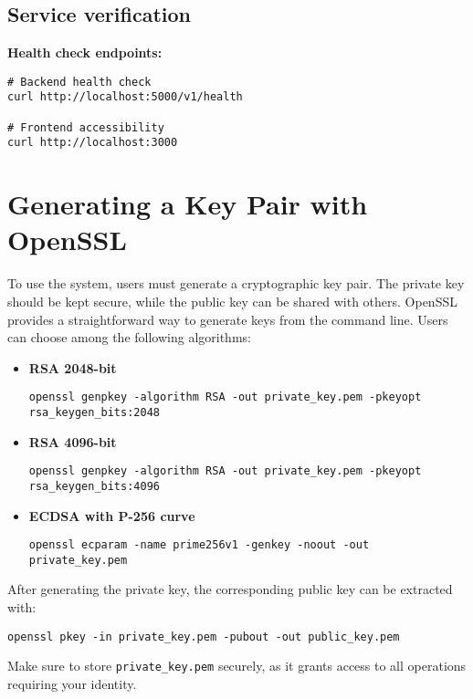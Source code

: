 \subsection{Service verification}

\textbf{Health check endpoints:}
\begin{verbatim}
# Backend health check
curl http://localhost:5000/v1/health

# Frontend accessibility
curl http://localhost:3000
\end{verbatim}

\section{Generating a Key Pair with OpenSSL}

To use the system, users must generate a cryptographic key pair. 
The private key should be kept secure, while the public key can be shared with others. 
OpenSSL provides a straightforward way to generate keys from the command line. 
Users can choose among the following algorithms:

\begin{itemize}
    \item \textbf{RSA 2048-bit}
    \begin{verbatim}
openssl genpkey -algorithm RSA -out private_key.pem -pkeyopt rsa_keygen_bits:2048
    \end{verbatim}

    \item \textbf{RSA 4096-bit}
    \begin{verbatim}
openssl genpkey -algorithm RSA -out private_key.pem -pkeyopt rsa_keygen_bits:4096
    \end{verbatim}

    \item \textbf{ECDSA with P-256 curve}
    \begin{verbatim}
openssl ecparam -name prime256v1 -genkey -noout -out private_key.pem
    \end{verbatim}
\end{itemize}

After generating the private key, the corresponding public key can be extracted with:

\begin{verbatim}
openssl pkey -in private_key.pem -pubout -out public_key.pem
\end{verbatim}

Make sure to store \texttt{private\_key.pem} securely, as it grants access to all operations requiring your identity.
